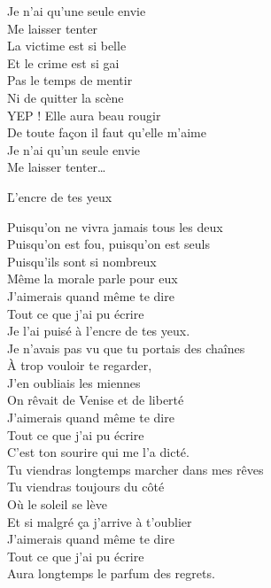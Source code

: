 \documentclass{novel}
\begin{document}
{\begin{minipage}[t][0.4\textheight][t]{\textwidth}
\begin{multicols}{2}
Je n'ai qu'une seule envie \\
Me laisser tenter \\
La victime est si belle \\
Et le crime est si gai \\

Pas le temps de mentir \\
Ni de quitter la scène \\
YEP ! Elle aura beau rougir \\
De toute façon il faut qu'elle m'aime \\
Je n'ai qu'un seule envie \\
Me laisser tenter… 
\end{multicols}
\end{minipage}
\vspace{0.02\textheight}

\begin{minipage}[b][0.55\textheight][t]{\textwidth}
\h*{L’encre de tes yeux}
\begin{multicols}{2}
\scriptsize
Puisqu'on ne vivra jamais tous les deux \\
Puisqu'on est fou, puisqu'on est seuls \\
Puisqu'ils sont si nombreux \\
Même la morale parle pour eux \\

J'aimerais quand même te dire \\
Tout ce que j'ai pu écrire \\
Je l'ai puisé à l'encre de tes yeux. \\

Je n'avais pas vu que tu portais des chaînes \\
À trop vouloir te regarder, \\
J'en oubliais les miennes \\
On rêvait de Venise et de liberté \\
J'aimerais quand même te dire \\
Tout ce que j'ai pu écrire \\
C'est ton sourire qui me l'a dicté. \\

Tu viendras longtemps marcher dans mes rêves \\
Tu viendras toujours du côté \\
Où le soleil se lève \\
Et si malgré ça j'arrive à t'oublier \\
J'aimerais quand même te dire \\
Tout ce que j'ai pu écrire \\
Aura longtemps le parfum des regrets. \\
\end{multicols}
\end{minipage}
}
\end{document}
